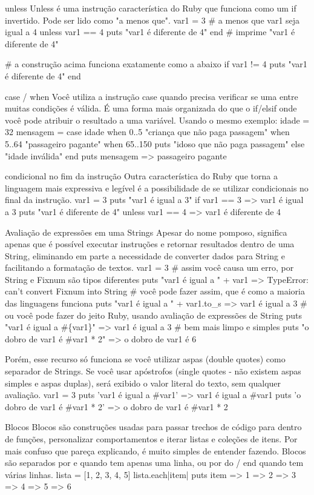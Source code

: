\documentclass[12pt]{book} %
\begin{document}
unless
Unless é uma instrução característica do Ruby que funciona como um if invertido. Pode ser lido como "a menos que".
var1 = 3
\# a menos que var1 seja igual a 4
unless var1 == 4
  puts "var1 é diferente de 4"
end
\# imprime "var1 é diferente de 4"

\# a construção acima funciona exatamente como a abaixo
if var1 != 4
  puts "var1 é diferente de 4"
end

case / when
Você utiliza a instrução case quando precisa verificar se uma entre muitas condições é válida. É uma forma mais organizada do que o if/elsif onde você pode atribuir o resultado a uma variável.
Usando o mesmo exemplo:
idade = 32
mensagem = case idade
  when 0..5
    "criança que não paga passagem"
  when 5..64
    "passageiro pagante"
  when 65..150
    puts "idoso que não paga passagem"
  else
    "idade inválida"
  end
puts mensagem
=> passageiro pagante

condicional no fim da instrução
Outra característica do Ruby que torna a linguagem mais expressiva e legível é a possibilidade de se utilizar condicionais no final da instrução.
var1 = 3
puts "var1 é igual a 3" if var1 == 3
=> var1 é igual a 3
puts "var1 é diferente de 4" unless var1 == 4
=> var1 é diferente de 4

Avaliação de expressões em uma Strings
Apesar do nome pomposo, significa apenas que é possível executar instruções e retornar resultados dentro de uma String, eliminando em parte a necessidade de converter dados para String e facilitando a formatação de textos.
var1 = 3
\# assim você causa um erro, por String e Fixnum são tipos diferentes
puts "var1 é igual a " + var1
=> TypeError: can't convert Fixnum into String
\# você pode fazer assim, que é como a maioria das linguagens funciona
puts "var1 é igual a " + var1.to\_s
=> var1 é igual a 3
\# ou você pode fazer do jeito Ruby, usando avaliação de expressões de String
puts "var1 é igual a \#\{var1\}"
=> var1 é igual a 3
\# bem mais limpo e simples
puts "o dobro de var1 é \#{var1 * 2}"
=> o dobro de var1 é 6

Porém, esse recurso só funciona se você utilizar aspas (double quotes) como separador de Strings. Se você usar apóstrofos (single quotes - não existem aspas simples e aspas duplas), será exibido o valor literal do texto, sem qualquer avaliação.
var1 = 3
puts 'var1 é igual a \#{var1}'
=> var1 é igual a \#{var1}
puts 'o dobro de var1 é \#{var1 * 2}'
=> o dobro de var1 é \#{var1 * 2}

Blocos
Blocos são construções usadas para passar trechos de código para dentro de funções, personalizar comportamentos e iterar listas e coleções de itens. Por mais confuso que pareça explicando, é muito simples de entender fazendo.
Blocos são separados por { e } quando tem apenas uma linha, ou por do / end quando tem várias linhas.
lista = [1, 2, 3, 4, 5]
lista.each{|item| puts item}
=> 1
=> 2
=> 3
=> 4
=> 5
=> 6
\end{document}
